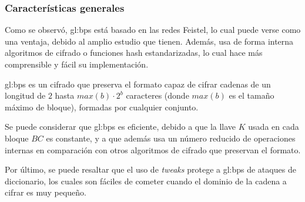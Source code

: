 
\subsubsection{Características generales}



Como se observó, \gls{gl:bps} está basado en las redes Feistel, lo cual puede
verse como una ventaja, debido al amplio estudio que tienen. Además, usa de
forma interna algoritmos de cifrado o funciones hash estandarizadas, lo
cual hace más comprensible y fácil su implementación.

\Gls{gl:bps} es un cifrado que preserva el formato capaz de cifrar cadenas de
un longitud de $2$ hasta $max(b) \cdot 2^{b}$ caracteres (donde $max(b)$ es el
tamaño máximo de bloque), formadas por cualquier conjunto.

Se puede considerar que \gls{gl:bps} es eficiente, debido a que la llave $K$
usada en cada bloque $BC$ es constante, y a que además usa un número reducido
de operaciones internas en comparación con otros algoritmos de cifrado que
preservan el formato.

Por último, se puede resaltar que el uso de \textit{tweaks} protege a
\gls{gl:bps} de ataques de diccionario, los cuales son fáciles de cometer cuando
el dominio de la cadena a cifrar es muy pequeño.


